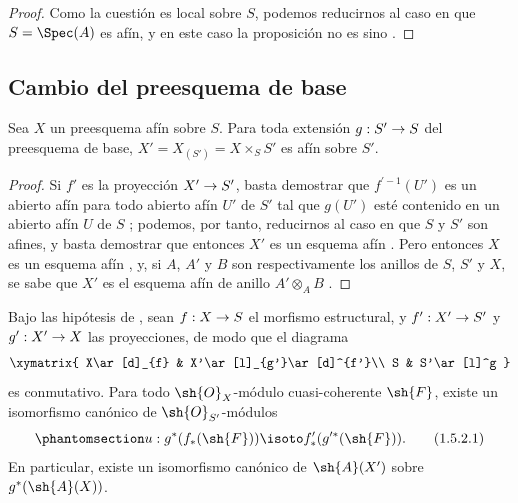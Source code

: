 \documentclass[oneside,10pt]{amsart}
\makeatletter
\newcommand{\ega@arrow}[2]{\mathchoice{#1}{#2}{#2}{#2}}
\renewcommand{\to}{\ega@arrow{\longrightarrow}{\rightarrow}}
\let\EGAOriginalLabel\label
\renewcommand{\label}[1]{\phantomsection\EGAOriginalLabel{#1}}
\makeatother
\begin{document}
\begin{proof}
Como la cuestión es local sobre $S$, podemos reducirnos al caso en que $S=\Spec(A)$ es afín, y en este caso la proposición no es sino .
\end{proof}

\subsection{Cambio del preesquema de base}
\label{subsection:II.1.5}

\begin{proposition}[1.5.1]
\label{II.1.5.1}
Sea $X$ un preesquema afín sobre $S$.
Para toda extensión $g:S'\to S$ del preesquema de base, $X'=X_{(S')}=X\times_S S'$ es afín sobre $S'$.
\end{proposition}

\begin{proof}
Si $f'$ es la proyección $X'\to S'$, basta demostrar que $f^{\prime-1}(U')$ es un abierto afín para todo abierto afín $U'$ de $S'$ tal que $g(U')$ esté contenido en un abierto afín $U$ de $S$ ; podemos, por tanto, reducirnos al caso en que $S$ y $S'$ son afines, y basta demostrar que entonces $X'$ es un esquema afín .
Pero entonces $X$ es un esquema afín , y, si $A$, $A'$ y $B$ son respectivamente los anillos de $S$, $S'$ y $X$, se sabe que $X'$ es el esquema afín de anillo $A'\otimes_A B$ .
\end{proof}

\begin{corollary}[1.5.2]
\label{II.1.5.2}
Bajo las hipótesis de , sean $f:X\to S$ el morfismo estructural, y $f':X'\to S'$ y $g':X'\to X$ las proyecciones, de modo que el diagrama
\[
  \xymatrix{
    X\ar[d]_{f} &
    X'\ar[l]_{g'}\ar[d]^{f'}\\
    S &
    S'\ar[l]^g
  }
\]
es conmutativo.
Para todo $\sh{O}_X$-módulo cuasi-coherente $\sh{F}$, existe un isomorfismo canónico de $\sh{O}_{S'}$-módulos
\[
\label{II.1.5.2.1}
  u:g^*(f_*(\sh{F}))\isoto f'_*(g^{\prime*}(\sh{F})).
  \tag{1.5.2.1}
\]
En particular, existe un isomorfismo canónico de $\sh{A}(X')$ sobre $g^*(\sh{A}(X))$.
\end{corollary}
\end{document}
